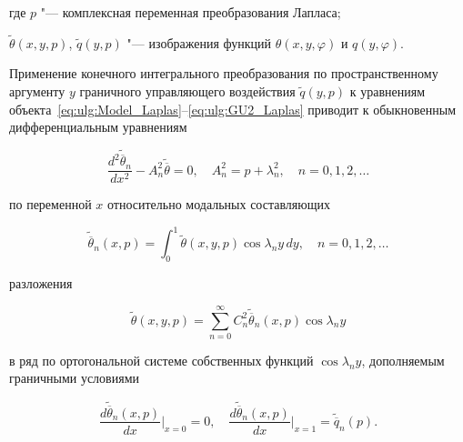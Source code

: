 где $ p $ "--- комплексная переменная преобразования Лапласа; 

$\widetilde \theta (x,y,p)$, $\widetilde q(y,p)$ "--- изображения функций  $ \theta (x,y,\varphi)$ и  $ q(y,\varphi)$.



Применение конечного интегрального преобразования  по пространственному аргументу $ y$ граничного управляющего воздействия  $ \widetilde q(y,p)$ к уравнениям объекта~\eqref{eq:ulg:Model_Laplas}--\eqref{eq:ulg:GU2_Laplas} приводит к обыкновенным дифференциальным уравнениям 

\begin{equation}\label{eq:ulg:OrdDifEq_Laplas}

\frac{{d^2} {\widetilde {\overline \theta  }}_n}{d{x^2}} - A_n^2{\widetilde {\overline \theta  }} = 0,\quad 

A_n^2 = p + \lambda _n^2,\quad n = 0, 1, 2, \dots

\end{equation}

по переменной  $ x $ относительно модальных составляющих 

\begin{equation}\label{eq:ulg:TemperMody_Laplas}

{\widetilde {\overline {\theta } }_n}(x,p) = \int _0^1 {\widetilde {\theta }(x,y,p)}  \cos \lambda_n y\,dy,\quad n = 0, 1, 2,\dots

\end{equation}

разложения

\begin{equation}\label{eq:ulg:Series_Temper_Laplas}

\widetilde \theta (x,y,p) = \sum\limits_{n = 0}^\infty  {C_n^2{{\widetilde  {\overline {\theta }} }_n}(x,p)}  \cos \lambda_ny

\end{equation}

 в ряд по ортогональной системе собственных функций $ \cos \lambda_ny $, дополняемым граничными условиями

\begin{equation}

\label{eq:ulg:GU_TemperMody_Laplas}

\frac{d{{\widetilde  {\overline \theta } }_n}(x,p)}{dx}\Bigr|_{x=0} = 0,\quad \frac{d{{\widetilde  {\overline \theta } }_n}(x,p)}{dx}\Bigr|_{x=1} = {\widetilde  {\overline q} _n}(p).

\end{equation}

